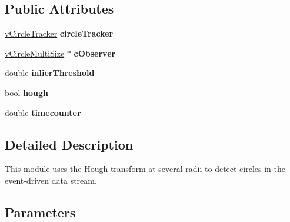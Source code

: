 \subsection*{Public Attributes}
\begin{DoxyCompactItemize}
\item 
\hypertarget{classvCircleReader_a7b0ae9557cbe36e72339cc7479d99833}{\hyperlink{classvCircleTracker}{v\-Circle\-Tracker} {\bfseries circle\-Tracker}}\label{classvCircleReader_a7b0ae9557cbe36e72339cc7479d99833}

\item 
\hypertarget{classvCircleReader_a8aff6c9feaa9806894f739e7c62b8c69}{\hyperlink{classvCircleMultiSize}{v\-Circle\-Multi\-Size} $\ast$ {\bfseries c\-Observer}}\label{classvCircleReader_a8aff6c9feaa9806894f739e7c62b8c69}

\item 
\hypertarget{classvCircleReader_abb1da4c345eb519b695927d12f2f1ec8}{double {\bfseries inlier\-Threshold}}\label{classvCircleReader_abb1da4c345eb519b695927d12f2f1ec8}

\item 
\hypertarget{classvCircleReader_a2a026b4c43ab7e721b6089b4118767a4}{bool {\bfseries hough}}\label{classvCircleReader_a2a026b4c43ab7e721b6089b4118767a4}

\item 
\hypertarget{classvCircleReader_a0bcf9e8b5c28b2ea048ab75c4213023e}{double {\bfseries timecounter}}\label{classvCircleReader_a0bcf9e8b5c28b2ea048ab75c4213023e}

\end{DoxyCompactItemize}


\subsection{Detailed Description}
This module uses the Hough transform at several radii to detect circles in the event-\/driven data stream.\hypertarget{group__aexGrabber_parameters_sec}{}\subsection{Parameters}\label{group__aexGrabber_parameters_sec}

